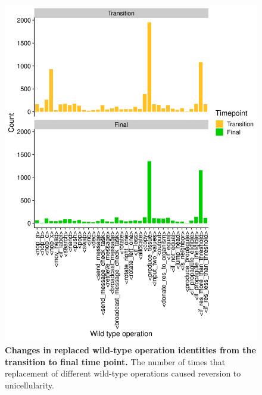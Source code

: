 \documentclass[
]{book}
\begin{document}
\begin{figure}
\centering
\includegraphics{images/Wildtype_operations_at_transition_and_final_time_point_20DEC22.png}
\caption{\label{fig:wt-operation-identities}\textbf{Changes in replaced wild-type operation identities from the transition to final time point.} The number of times that replacement of different wild-type operations caused reversion to unicellularity.}
\end{figure}
\end{document}
